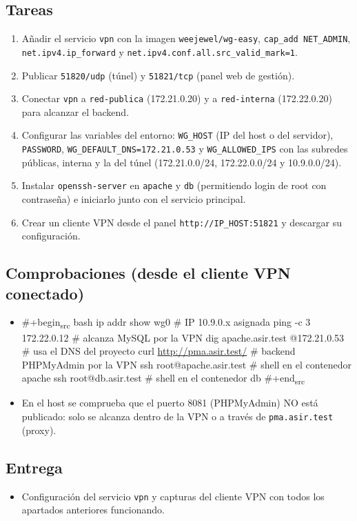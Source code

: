 \documentclass[11pt]{article}
\begin{document}
\subsection{Tareas}
\label{sec:org0000060}
\begin{enumerate}
\item Añadir el servicio \texttt{vpn} con la imagen \texttt{weejewel/wg-easy}, \texttt{cap\_add NET\_ADMIN},
\texttt{net.ipv4.ip\_forward} y \texttt{net.ipv4.conf.all.src\_valid\_mark=1}.
\item Publicar \texttt{51820/udp} (túnel) y \texttt{51821/tcp} (panel web de gestión).
\item Conectar \texttt{vpn} a \texttt{red-publica} (172.21.0.20) y a \texttt{red-interna} (172.22.0.20)
para alcanzar el backend.
\item Configurar las variables del entorno: \texttt{WG\_HOST} (IP del host o del servidor),
\texttt{PASSWORD}, \texttt{WG\_DEFAULT\_DNS=172.21.0.53} y \texttt{WG\_ALLOWED\_IPS} con las subredes
públicas, interna y la del túnel (172.21.0.0/24, 172.22.0.0/24 y 10.9.0.0/24).
\item Instalar \texttt{openssh-server} en \texttt{apache} y \texttt{db} (permitiendo login de root con
contraseña) e iniciarlo junto con el servicio principal.
\item Crear un cliente VPN desde el panel \texttt{http://IP\_HOST:51821} y descargar su
configuración.
\end{enumerate}
\subsection{Comprobaciones (desde el cliente VPN conectado)}
\label{sec:org0000063}
\begin{itemize}
\item \#+begin\textsubscript{src} bash
ip addr show wg0                     \# IP 10.9.0.x asignada
ping -c 3 172.22.0.12                \# alcanza MySQL por la VPN
dig apache.asir.test @172.21.0.53    \# usa el DNS del proyecto
curl \url{http://pma.asir.test/}           \# backend PHPMyAdmin por la VPN
ssh root@apache.asir.test            \# shell en el contenedor apache
ssh root@db.asir.test                \# shell en el contenedor db
\#+end\textsubscript{src}
\item En el host se comprueba que el puerto 8081 (PHPMyAdmin) NO está publicado:
solo se alcanza dentro de la VPN o a través de \texttt{pma.asir.test} (proxy).
\end{itemize}
\subsection{Entrega}
\label{sec:org0000066}
\begin{itemize}
\item Configuración del servicio \texttt{vpn} y capturas del cliente VPN con todos los
apartados anteriores funcionando.
\end{itemize}
\end{document}
